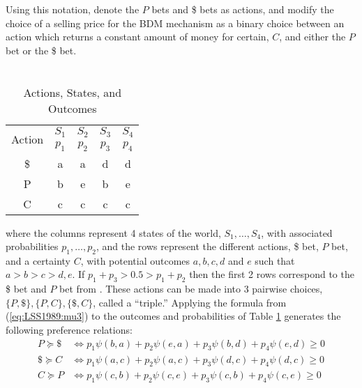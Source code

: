 \documentclass[../main.tex]{subfiles}
\begin{document}
Using this notation, \textcite{Loomes1989} denote the $P$ bets and {\$} bets as actions, and modify the choice of a selling price for the BDM mechanism as a binary choice between an action which returns a constant amount of money for certain, $C$, and either the $P$ bet or the {\$} bet.
\begin{table}[ht]
	\centering
	\caption{ \textcite[149]{Loomes1989} \\ Actions, States, and Outcomes }
	\label{tb:LSS1989:ASO}
	\begin{tabular}{ccccc}
		\multirow{2}{*}{Action} & $S_1$ & $S_2$ & $S_3$ & $S_4$ \\[-.75em]
		                        & $p_1$ & $p_2$ & $p_3$ & $p_4$ \\\hline
		                    {\$}  &   a   &   a   &   d   &   d   \\
		                    P   &   b   &   e   &   b   &   e   \\
		                    C   &   c   &   c   &   c   &   c   
	\end{tabular}
\end{table}
\noindent where the columns represent 4 states of the world, $S_1 , \ldots , S_4$, with associated probabilities $p_1, \ldots, p_2$, and the rows represent the different actions, {\$} bet, $P$ bet, and a certainty $C$, with potential outcomes $a,b,c,d$ and $e$ such that $a > b > c > d,e$.
If $p_1 + p_3 > 0.5 > p_1 + p_2$ then the first 2 rows correspond to the {\$} bet and $P$ bet from \textcite{Grether1979}.
These actions can be made into 3 pairwise choices, $\lbrace P , {\$} \rbrace , \lbrace P,C \rbrace , \lbrace {\$}, C \rbrace$, called a \enquote{triple.}
Applying the formula from (\ref{eq:LSS1989:mu3}) to the outcomes and probabilities of Table \ref{tb:LSS1989:ASO} generates the following preference relations:
\begin{align}
	P  \succcurlyeq {\$} &\Leftrightarrow p_1 \psi(b,a) + p_2 \psi(e,a) + p_3 \psi(b,d) + p_4 \psi(e,d) \geq 0 \label{eq:LSS1989:PD}\\
	{\$} \succcurlyeq C  &\Leftrightarrow p_1 \psi(a,c) + p_2 \psi(a,c) + p_3 \psi(d,c) + p_4 \psi(d,c) \geq 0 \label{eq:LSS1989:DC}\\
	C  \succcurlyeq P  &\Leftrightarrow p_1 \psi(c,b) + p_2 \psi(c,e) + p_3 \psi(c,b) + p_4 \psi(c,e) \geq 0 \label{eq:LSS1989:CP}
\end{align}
\end{document}
